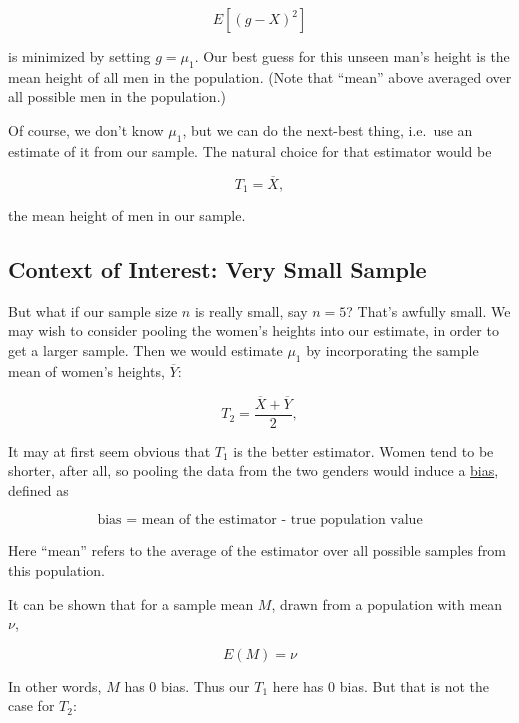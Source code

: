 \begin{equation}
E[(g-X)^2]
\end{equation}

is minimized by setting $g = \mu_1$.  Our best guess for this unseen
man's height is the mean height of all men in the population.  (Note
that ``mean'' above averaged over all possible men in the population.) 

Of course, we don't know $\mu_1$, but we can do the next-best thing,
i.e.\ use an estimate of it from our sample.  The natural choice for
that estimator would be

\begin{equation}
T_1 = \overline{X},
\end{equation}

the mean height of men in our sample.

\subsection{Context of Interest: Very Small Sample}

But what if our sample size $n$ is really small, say $n = 5$?  That's
awfully small.  We may wish to consider pooling the women's heights into
our estimate, in order to get a larger sample.  Then we would estimate
$\mu_1$ by incorporating the sample mean of women's heights,
$\overline{Y}$:

\begin{equation}
T_2 = \frac{\overline{X}+\overline{Y}}{2}, 
\end{equation}

It may at first seem obvious that $T_1$ is the better estimator.  Women
tend to be shorter, after all, so pooling the data from the two genders
would induce a \underline{bias}, defined as  

\begin{equation}
\textrm{bias = mean of the estimator - true population value}
\end{equation}

Here  ``mean'' refers to the average of the estimator over all possible
samples from this population.  

It can be shown that for a sample mean $M$, drawn from a population with
mean $\nu$,

\begin{equation}
E(M) = \nu
\end{equation}

In other words, $M$ has 0 bias.  Thus our $T_1$ here has 0 bias.  But
that is not the case for $T_2$:

